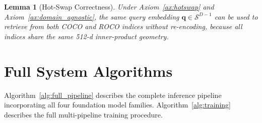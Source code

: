 \documentclass[10pt,conference]{IEEEtran}
\theoremstyle{ieeethm}
\newtheorem{lemma}[theorem]{Lemma}
\theoremstyle{ieeedef}
\theoremstyle{ieeeremark}
\begin{document}
\begin{lemma}[Hot-Swap Correctness]
\label{lem:hotswap}
Under Axiom~\ref{ax:hotswap} and Axiom~\ref{ax:domain_agnostic}, the same query embedding $\mathbf{q} \in \mathcal{S}^{D-1}$ can be used to retrieve from both COCO and ROCO indices without re-encoding, because all indices share the same 512-d inner-product geometry.
\end{lemma}

\section{Full System Algorithms}
\label{sec:algorithm}

Algorithm~\ref{alg:full_pipeline} describes the complete inference pipeline incorporating all four foundation model families. Algorithm~\ref{alg:training} describes the full multi-pipeline training procedure.
\end{document}

